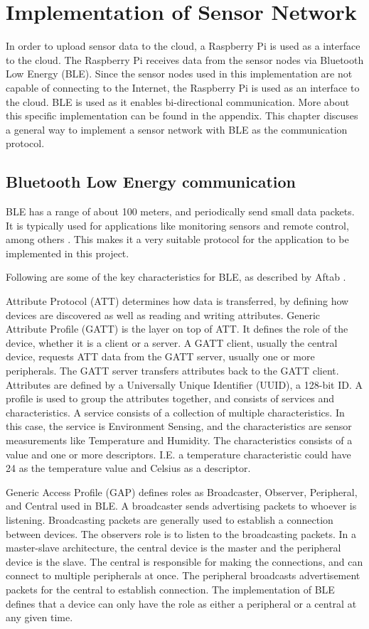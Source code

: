 \chapter{Implementation of Sensor Network}
 In order to upload sensor data to the cloud, a Raspberry Pi is used as a interface to the cloud. The Raspberry Pi receives data from the sensor nodes via Bluetooth Low Energy (BLE). Since the sensor nodes used in this implementation are not capable of connecting to the Internet, the Raspberry Pi is used as an interface to the cloud. BLE is used as it enables bi-directional communication. More about this specific implementation can be found in the appendix. This chapter discuses a general way to implement a sensor network with BLE as the communication protocol.

\section{Bluetooth Low Energy communication}
BLE has a range of about 100 meters, and periodically send small data packets. It is typically used for applications like monitoring sensors and remote control, among others \cite{BLENordic}. This makes it a very suitable protocol for the application to be implemented in this project. 

Following are some of the key characteristics for BLE, as described by Aftab \cite{AftabBLE}. 

Attribute Protocol (ATT) determines how data is transferred, by defining how devices are discovered as well as reading and writing attributes. Generic Attribute Profile (GATT) is the layer on top of ATT. It defines the role of the device, whether it is a client or a server. A GATT client, usually the central device, requests ATT data from the GATT server, usually one or more peripherals. The GATT server transfers attributes back to the GATT client. Attributes are defined by a Universally Unique Identifier (UUID), a 128-bit ID. A profile is used to group the attributes together, and consists of services and characteristics. A service consists of a collection of multiple characteristics. In this case, the service is Environment Sensing, and the characteristics are sensor measurements like Temperature and Humidity. The characteristics consists of a value and one or more descriptors. I.E. a temperature characteristic could have 24 as the temperature value and Celsius as a descriptor.  

Generic Access Profile (GAP) defines roles as Broadcaster, Observer, Peripheral, and Central used in BLE. A broadcaster sends advertising packets to whoever is listening. Broadcasting packets are generally used to establish a connection between devices. The observers role is to listen to the broadcasting packets. In a master-slave architecture, the central device is the master and the peripheral device is the slave. The central is responsible for making the connections, and can connect to multiple peripherals at once. The peripheral broadcasts advertisement packets for the central to establish connection. The implementation of BLE defines that a device can only have the role as either a peripheral or a central at any given time. 